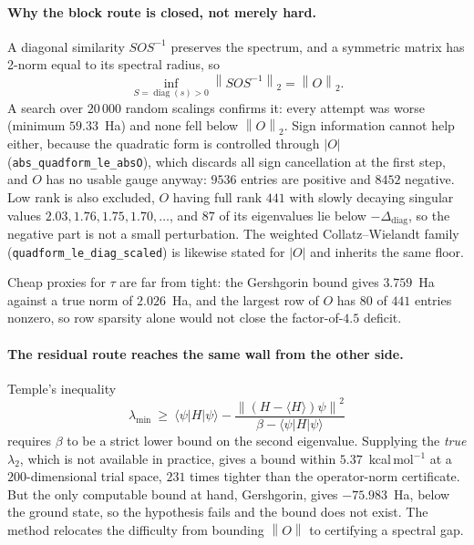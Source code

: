 \documentclass[11pt,a4paper]{article}
\theoremstyle{plain}
\theoremstyle{definition}
\theoremstyle{remark}
\newcommand{\norm}[1]{\left\lVert #1\right\rVert}
\providecommand{\path}[1]{\texttt{#1}}
\begin{document}
\paragraph{Why the block route is closed, not merely hard.}
A diagonal similarity $SOS^{-1}$ preserves the spectrum, and a symmetric matrix has
2-norm equal to its spectral radius, so
\[
  \inf_{S=\operatorname{diag}(s)>0}\norm{SOS^{-1}}_2 = \norm{O}_2 .
  \label{eq:similarity-floor}
\]
A search over $20\,000$ random scalings confirms it: every attempt was worse
(minimum $59.33$~Ha) and none fell below $\norm{O}_2$. Sign information cannot help
either, because the quadratic form is controlled through $|O|$
(\path{abs_quadform_le_absO}), which discards all sign cancellation at the first
step, and $O$ has no usable gauge anyway: $9536$ entries are positive and $8452$
negative. Low rank is also excluded, $O$ having full rank $441$ with slowly decaying
singular values $2.03,1.76,1.75,1.70,\dots$, and $87$ of its eigenvalues lie below
$-\Delta_{\mathrm{diag}}$, so the negative part is not a small perturbation. The
weighted Collatz--Wielandt family (\path{quadform_le_diag_scaled}) is likewise
stated for $|O|$ and inherits the same floor.

Cheap proxies for $\tau$ are far from tight: the Gershgorin bound gives
$3.759$~Ha against a true norm of $2.026$~Ha, and the largest row of $O$ has $80$ of
$441$ entries nonzero, so row sparsity alone would not close the factor-of-$4.5$
deficit.

\paragraph{The residual route reaches the same wall from the other side.}
Temple's inequality
\[
  \lambda_{\min}\ \ge\ \langle\psi|H|\psi\rangle
   - \frac{\norm{(H-\langle H\rangle)\psi}^{2}}{\beta-\langle\psi|H|\psi\rangle}
\]
requires $\beta$ to be a strict lower bound on the second eigenvalue. Supplying the
\emph{true} $\lambda_2$, which is not available in practice, gives a bound within
$5.37$~kcal\,mol$^{-1}$ at a $200$-dimensional trial space, $231$ times tighter than
the operator-norm certificate. But the only computable bound at hand, Gershgorin,
gives $-75.983$~Ha, below the ground state, so the hypothesis fails and the bound
does not exist. The method relocates the difficulty from bounding $\norm{O}$ to
certifying a spectral gap.
\end{document}
